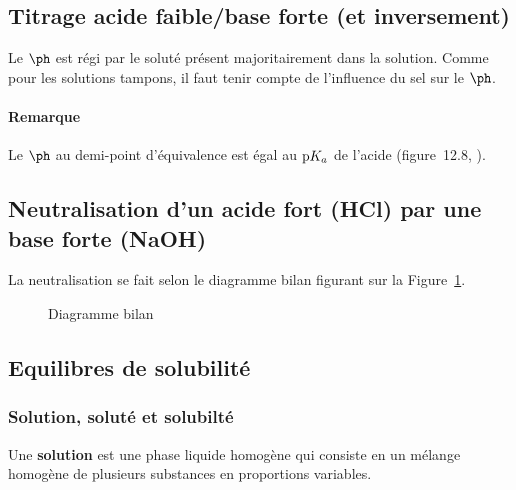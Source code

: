 \subsection{Titrage acide faible/base forte (et inversement)}
Le $\ph$ est régi par le soluté présent majoritairement dans la solution. Comme pour les solutions
tampons, il faut tenir compte de l'influence du sel sur le $\ph$.

\paragraph{Remarque}
Le $\ph$ au demi-point d'équivalence est égal au $\mathrm{p}K_a$ de l'acide (figure~12.8, \cite[p.~490]{atkins2011principes}).

\subsection{Neutralisation d'un acide fort (HCl) par une base forte (NaOH)}
La neutralisation se fait selon le diagramme bilan figurant sur la Figure~\ref{fig:diagbil}.

\begin{figure}[ht!]
  \begin{center}
  \end{center}
  \caption{Diagramme bilan}
  \label{fig:diagbil}
\end{figure}

\subsection{Equilibres de solubilité}
\subsubsection{Solution, soluté et solubilté}
Une \textbf{solution} est une phase liquide homogène qui consiste en un mélange homogène
de plusieurs substances en proportions variables.

